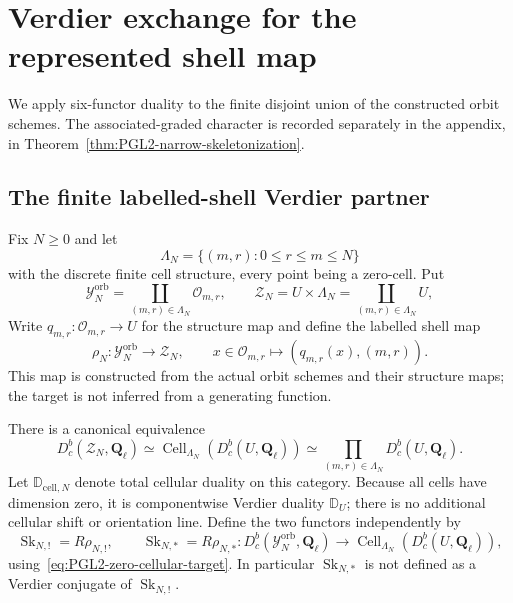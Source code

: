 \documentclass[11pt]{article}
\theoremstyle{definition}
\theoremstyle{remark}
\newcommand{\Qell}{\mathbf Q_\ell}
\newcommand{\D}{\mathbb D}
\newcommand{\Cell}{\operatorname{Cell}}
\newcommand{\Sk}{\operatorname{Sk}}
\begin{document}
\section{Verdier exchange for the represented shell map}
\label{sec:PGL2-narrow-skeletonization}

We apply six-functor duality to the finite disjoint union of the constructed
orbit schemes.  The associated-graded character is recorded separately in
the appendix, in Theorem~\ref{thm:PGL2-narrow-skeletonization}.

\subsection{The finite labelled-shell Verdier partner}

Fix $N\ge0$ and let
\begin{equation}
 \Lambda_N=\{(m,r):0\le r\le m\le N\}
 \label{eq:PGL2-finite-shell-index-set}
\end{equation}
with the discrete finite cell structure, every point being a zero-cell.  Put
\begin{equation}
 \mathscr Y_N^{\mathrm{orb}}
 =\coprod_{(m,r)\in\Lambda_N}\mathscr O_{m,r},
 \qquad
 \mathscr Z_N=U\times\Lambda_N
 =\coprod_{(m,r)\in\Lambda_N}U,
 \label{eq:PGL2-finite-shell-source-target}
\end{equation}
Write $q_{m,r}:\mathscr O_{m,r}\to U$ for the structure map and define the
labelled shell map
\begin{equation}
 \rho_N:\mathscr Y_N^{\mathrm{orb}}\longrightarrow\mathscr Z_N,
 \qquad
 x\in\mathscr O_{m,r}\longmapsto(q_{m,r}(x),(m,r)).
 \label{eq:PGL2-labelled-shell-map}
\end{equation}
This map is constructed from the actual orbit schemes and their structure
maps; the target is not inferred from a generating function.

There is a canonical equivalence
\begin{equation}
 D_c^b(\mathscr Z_N,\Qell)
 \simeq
 \Cell_{\Lambda_N}(D_c^b(U,\Qell))
 \simeq
 \prod_{(m,r)\in\Lambda_N}D_c^b(U,\Qell).
 \label{eq:PGL2-zero-cellular-target}
\end{equation}
Let $\D_{\mathrm{cell},N}$ denote total cellular duality on this category.
Because all cells have dimension zero, it is componentwise Verdier duality
$\D_U$; there is no additional cellular shift or orientation line.  Define
the two functors independently by
\begin{equation}
 \Sk_{N,!}=R\rho_{N,!},\qquad
 \Sk_{N,*}=R\rho_{N,*}:
 D_c^b(\mathscr Y_N^{\mathrm{orb}},\Qell)
 \longrightarrow
 \Cell_{\Lambda_N}(D_c^b(U,\Qell)),
 \label{eq:PGL2-genuine-Sk-pair}
\end{equation}
using~\eqref{eq:PGL2-zero-cellular-target}.  In particular $\Sk_{N,*}$ is
not defined as a Verdier conjugate of $\Sk_{N,!}$.
\end{document}

